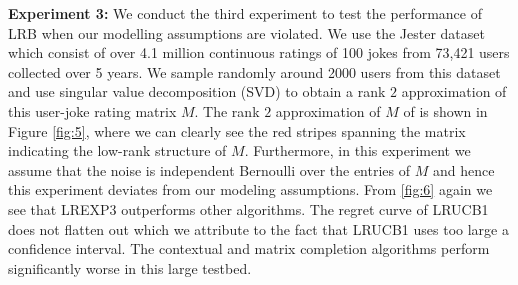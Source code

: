 
\textbf{Experiment 3:} We conduct the third experiment to test the performance of LRB when our modelling assumptions are violated. We use the Jester dataset \citep{goldberg2001eigentaste} which consist of over 4.1 million continuous ratings of 100 jokes from 73,421 users collected over 5 years. We sample randomly around 2000 users from this dataset and use singular value decomposition (SVD) to obtain a rank $2$ approximation of this user-joke rating matrix $M$. The rank $2$ approximation of $M$ of  is shown in Figure \ref{fig:5}, where we can clearly see the red stripes spanning the matrix indicating the low-rank structure of $M$. Furthermore, in this experiment we assume that the noise is independent Bernoulli over the entries of $M$ and hence this experiment deviates from our modeling assumptions. From \ref{fig:6} again we see that LREXP3 outperforms other algorithms. The regret curve of LRUCB1 does not flatten out which we attribute to the fact that LRUCB1 uses too large a confidence interval. The contextual and matrix completion algorithms perform significantly worse in this large testbed.




